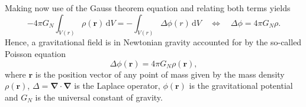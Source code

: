 \documentclass[a4paper,11pt]{article}
\numberwithin{equation}{section}
\newcommand\vect[1]{\ensuremath{\bm{#1}}}
\begin{document}
{\begin{equation}
\end{equation} Making now use of the Gauss theorem equation and relating both terms yields \begin{equation}
-4\pi G_N \int_{V(r)} \rho(\vect{r})\,\mathrm{d}V = -\int_{V(r)}\Delta \phi(r)\,\mathrm{d}V \quad \Leftrightarrow \quad \Delta \phi = 4\pi G_N \rho.
\end{equation} Hence, a gravitational field is in Newtonian gravity accounted for by the so-called Poisson equation \begin{equation}
\Delta \phi(\vect{r}) = 4\pi G_N \rho(\vect{r}),
\end{equation} where $\vect{r}$ is the position vector of any point of mass given by the mass density $\rho(\vect{r})$, $\Delta = \vect{\nabla} \cdot \vect{\nabla}$ is the Laplace operator, $\phi(\vect{r})$ is the gravitational potential and $G_N$ is the universal constant of gravity.
}
\end{document}
